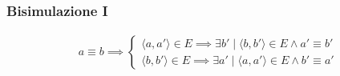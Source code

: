 \documentclass{beamer}
\begin{document}
\begin{frame}
    \frametitle{Bisimulazione I}
    \begin{gather*}
        a \equiv b \implies
        \begin{cases}
            \langle a, a' \rangle \in E \implies \exists b' \mid \langle b, b' \rangle \in E \land a' \equiv b'\\
            \langle b, b' \rangle \in E \implies \exists a' \mid \langle a, a' \rangle \in E \land b' \equiv a'
        \end{cases}
    \end{gather*}

    \begin{figure}
    \end{figure}
\end{frame}
\end{document}
